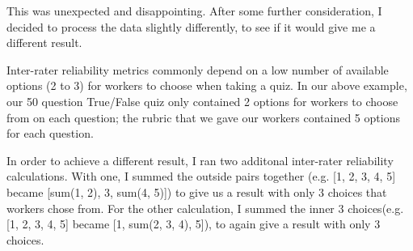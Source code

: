 				This was unexpected and disappointing. After some further consideration, I decided to process the data slightly differently, to see if it would give me a different result.

				Inter-rater reliability metrics commonly depend on a low number of available options (2 to 3) for workers to choose when taking a quiz. In our above example, our 50 question True/False quiz only contained 2 options for workers to choose from on each question; the rubric that we gave our workers contained 5 options for each question.

				In order to achieve a different result, I ran two additonal inter-rater reliability calculations. With one, I summed the outside pairs together (e.g. [1, 2, 3, 4, 5] became [sum(1, 2), 3, sum(4, 5)]) to give us a result with only 3 choices that workers chose from. For the other calculation, I summed the inner 3 choices(e.g. [1, 2, 3, 4, 5] became [1, sum(2, 3, 4), 5]), to again give a result with only 3 choices.


